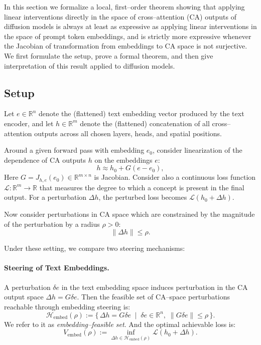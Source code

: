 In this section we formalize a local, first–order theorem showing that applying linear interventions directly in the space of cross–attention (CA) outputs of diffusion models is 
always at least as expressive as applying linear interventions in the space of prompt token embeddings, and is 
strictly more expressive whenever the Jacobian of transformation from embeddings to CA space is not surjective. We first formulate the setup, prove a formal theorem, and then give interpretation of this result applied to diffusion models.

\subsection{Setup}

Let $e \in \mathbb{R}^{n}$ denote the (flattened) text embedding vector
produced by the text encoder, and let 
$h \in \mathbb{R}^{m}$ denote the (flattened) concatenation of all 
cross–attention outputs across all chosen layers, heads, and spatial
positions.

Around a given forward pass with embedding $e_0$, consider linearization of the dependence of CA outputs $h$ on the embeddings $e$:
\begin{equation}
    h \approx h_0 + G (e - e_0),
\end{equation}
Here $G = J_{h,e}(e_0) \in \mathbb{R}^{m \times n}$ is Jacobian.
Consider also a continuous loss function 
$\mathcal{L} : \mathbb{R}^m \to \mathbb{R}$ 
that measures the degree to which a concept is present in the final
output.
For a perturbation $\Delta h$, the perturbed loss becomes 
$\mathcal{L}(h_0 + \Delta h)$.

Now consider perturbations in CA space which are constrained by the magnitude of the perturbation by a radius $\rho > 0$:
\begin{equation}
    \|\Delta h\| \le \rho.
\end{equation}

Under these setting, we compare two steering mechanisms:

\paragraph{Steering of Text Embeddings.}
A perturbation $\delta e$ in the text embedding space induces perturbation in the CA output space $\Delta h = G \delta e$. 
Then the feasible set of CA–space perturbations reachable through 
embedding steering is:
\begin{equation}
    \mathcal{H}_{\mathrm{embed}}(\rho)
    :=
    \{\, \Delta h = G \delta e \;\mid\; \delta e \in \mathbb{R}^n,
        \; \|G \delta e\| \le \rho \,\}.
\end{equation}
We refer to it as \textit{embedding–feasible set}. And the optimal achievable loss is:
\begin{equation}
    V_{\mathrm{embed}}(\rho)
    :=
    \inf_{\Delta h \in \mathcal{H}_{\mathrm{embed}}(\rho)}
        \mathcal{L}(h_0 + \Delta h).
\end{equation}

